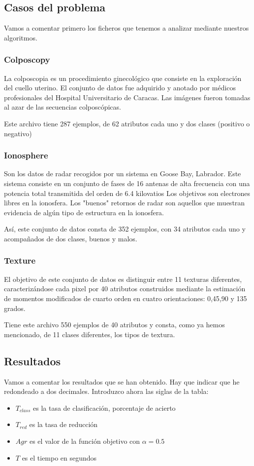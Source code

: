 \documentclass[11pt]{article}
\begin{document}
\subsection{Casos del problema}
Vamos a comentar primero los ficheros que tenemos a analizar mediante nuestros algoritmos.

\subsubsection{Colposcopy}
La colposcopia es un procedimiento ginecológico que consiste en la exploración del cuello uterino. El conjunto de datos fue adquirido y anotado por médicos profesionales del Hospital Universitario de Caracas. Las imágenes fueron tomadas al azar de las secuencias colposcópicas.

Este archivo tiene 287 ejemplos, de 62 atributos cada uno y dos clases (positivo o negativo)

\subsubsection{Ionosphere}
Son los datos de radar recogidos  por un sistema  en Goose Bay, Labrador. Este sistema consiste en un conjunto de fases de 16 antenas de alta frecuencia  con una potencia total transmitida  del orden de 6.4 kilovatios Los objetivos son electrones libres en la ionosfera. Los "buenos" retornos de radar son aquellos que muestran evidencia de algún tipo de estructura en la ionosfera. 

Así, este conjunto de datos consta de 352 ejemplos, con 34 atributos cada uno y acompañados de dos clases, buenos y malos.

\subsubsection{Texture}
El objetivo de este conjunto de datos es distinguir entre 11 texturas diferentes, caracterizándose cada pixel por 40 atributos construidos mediante la estimación de momentos modificados de cuarto orden en cuatro orientaciones: 0,45,90 y 135 grados.

Tiene este archivo 550 ejemplos de 40 atributos y consta, como ya hemos mencionado, de 11 clases diferentes, los tipos de textura.

\subsection{Resultados}
Vamos a comentar los resultados que se han obtenido. Hay que indicar que he redondeado a dos decimales. 
Introduzco ahora las siglas de la tabla:
\begin{itemize}
	\item $T_{class}$ es la tasa de clasificación, porcentaje de acierto
	\item $T_{red}$ es la tasa de reducción
	\item $Agr$ es el valor de la función objetivo con $\alpha=0.5$
	\item $T$ es el tiempo en segundos
\end{itemize}
\end{document}
